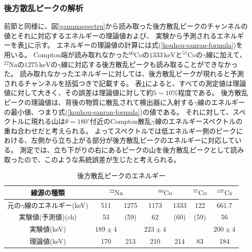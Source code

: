 \documentclass[11pt, titlepage, openany]{ltjsbook}
\newcommand{\slashcell}{\diagbox[width=3.5em,height=2em]{}{}}
\begin{document}
\subsubsection{後方散乱ピークの解析}
前節と同様に、図\ref{gammaspectru}から読み取った後方散乱ピークのチャンネルの値とそれに対応するエネルギーの理論値および、
実験から予測されるエネルギーを表\ref{kouhou-sanran-table}に示す。
エネルギーの理論値の計算には式(\ref{kouhou-sanran-formula})を用いる。
Compton端が読み取れなかった$^{60}\mathrm{Co}$の$1333\,\mathrm{keV}$と$^{57}\mathrm{Co}$の$\gamma$線に加えて、
$^{22}\mathrm{Na}$の$1275\,\mathrm{keV}$の$\gamma$線に対応する後方散乱ピークも読み取ることができなかった。
読み取れなかったエネルギーに対しては、後方散乱ピークが現れると予測されるチャンネルを括弧つきで記載する。
表\ref{kouhou-sanran-table}によると、すべての測定値は理論値に対して大きく、その誤差は理論値に対して約$5 \sim 10\%$程度である。
後方散乱ピークの理論値は、背後の物質に散乱されて検出器に入射する$\gamma$線のエネルギーの最小値、つまり式(\ref{kouhou-sanran-formula})の値である。
それに対して、スペクトルに現れる山は$\theta = 180^{\circ}$付近のCompton散乱$\gamma$線のエネルギースペクトルの重ね合わせだと考えられる。
よってスペクトルでは低エネルギー側のピークにおける、左側から立ち上がる部分が後方散乱ピークのエネルギーに対応している。
測定では、立ち下がりの右にあるピークの山を後方散乱ピークとして読み取ったので、このような系統誤差が生じたと考えられる。
\begin{table}[H]
    \centering
    \begin{tabular}{c|c|c|c|c|c|c}
        線源の種類 & \multicolumn{2}{c|}{$^{22}\mathrm{Na}$} & \multicolumn{2}{c|}{$^{60}\mathrm{Co}$} & $^{57}\mathrm{Co}$ & $^{137}\mathrm{Cs}$ \\ \hline
        元の$\gamma$線のエネルギー(keV) & 511 & 1275 & 1173 & 1333 & 122 & 661.7 \\ \hline
        実験値(予測値)(ch) & 53 & (59) & 62 & (60) & (59) & 56 \\ \hline
        実験値(keV) & $189 \pm 4$ & \slashcell & $223 \pm 4$ & \slashcell & \slashcell & $200 \pm 4$ \\ \hline
        理論値(keV) & 170 & 213 & 210 & 214 & 83 & 184
    \end{tabular}
    \caption{後方散乱ピークのエネルギー}
    \label{kouhou-sanran-table}
\end{table}
\end{document}

